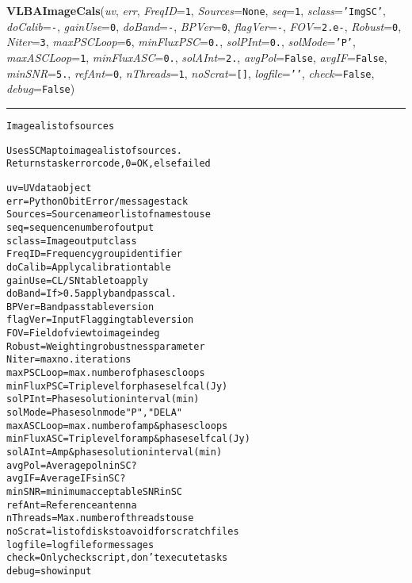     \begin{boxedminipage}{\textwidth}

    \raggedright \textbf{VLBAImageCals}(\textit{uv}, \textit{err}, \textit{FreqID}=\texttt{1\-}, \textit{Sources}=\texttt{N\-o\-n\-e\-}, \textit{seq}=\texttt{1\-}, \textit{sclass}=\texttt{'\-I\-m\-g\-S\-C\-'\-}, \textit{doCalib}=\texttt{-\-}, \textit{gainUse}=\texttt{0\-}, \textit{doBand}=\texttt{-\-}, \textit{BPVer}=\texttt{0\-}, \textit{flagVer}=\texttt{-\-}, \textit{FOV}=\texttt{2\-.\-e\--\-}, \textit{Robust}=\texttt{0\-}, \textit{Niter}=\texttt{3\-}, \textit{maxPSCLoop}=\texttt{6\-}, \textit{minFluxPSC}=\texttt{0\-.\-}, \textit{solPInt}=\texttt{0\-.\-}, \textit{solMode}=\texttt{'\-P\-'\-}, \textit{maxASCLoop}=\texttt{1\-}, \textit{minFluxASC}=\texttt{0\-.\-}, \textit{solAInt}=\texttt{2\-.\-}, \textit{avgPol}=\texttt{F\-a\-l\-s\-e\-}, \textit{avgIF}=\texttt{F\-a\-l\-s\-e\-}, \textit{minSNR}=\texttt{5\-.\-}, \textit{refAnt}=\texttt{0\-}, \textit{nThreads}=\texttt{1\-}, \textit{noScrat}=\texttt{[\-]\-}, \textit{logfile}=\texttt{'\-'\-}, \textit{check}=\texttt{F\-a\-l\-s\-e\-}, \textit{debug}=\texttt{F\-a\-l\-s\-e\-})

    \vspace{-1.5ex}

    \rule{\textwidth}{0.5\fboxrule}
\begin{alltt}
Image a list of sources

Uses SCMap to image a list of sources.
Returns task error code, 0=OK, else failed

uv         = UV data object
err        = Python Obit Error/message stack
Sources    = Source name or list of names to use
seq        = sequence number of output
sclass     = Image output class
FreqID     = Frequency group identifier
doCalib    = Apply calibration table
gainUse    = CL/SN table to apply
doBand     = If {\textgreater}0.5 apply bandpass cal.
BPVer      = Bandpass table version
flagVer    = Input Flagging table version
FOV        = Field of view to image in deg
Robust     = Weighting robustness parameter
Niter      = max no. iterations
maxPSCLoop = max. number of phase sc loops
minFluxPSC = Trip level for phase self cal (Jy)
solPInt    = Phase solution interval (min)
solMode    = Phase soln mode "P", "DELA"
maxASCLoop = max. number of amp\&phase sc loops
minFluxASC = Trip level for amp\&phase self cal (Jy)
solAInt    = Amp\&phase solution interval (min)
avgPol     = Average poln in SC?
avgIF      = Average IFs in SC?
minSNR     = minimum acceptable SNR in SC
refAnt     = Reference antenna
nThreads   = Max. number of threads to use
noScrat    = list of disks to avoid for scratch files
logfile    = logfile for messages
check      = Only check script, don't execute tasks
debug      = show input\end{alltt}

    \vspace{1ex}

    \end{boxedminipage}

